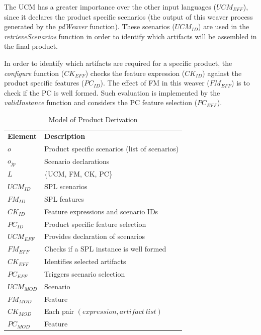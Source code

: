 \documentclass[times, 11pt,twocolumn]{article}
\begin{document}
The UCM has a greater importance over the other input languages ($UCM_{EFF}$),
since it declares the product specific scenarios (the output of this weaver
process generated by the \emph{pdWeaver} function). These scenarios ($UCM_{ID}$) are used
in the \emph{retrieveScenarios} function in order to identify which artifacts
will be assembled in the final product.

In order to identify which artifacts are required for a specific product, the
\emph{configure} function ($CK_{EFF}$) checks the feature expression ($CK_{ID}$)
against the product specific features ($PC_{ID}$). The effect of FM in this
weaver ($FM_{EFF}$) is to check if the PC is well formed. Such evaluation is
implemented by the \emph{validInstance} function and considers the PC feature
selection ($PC_{EFF}$). 

\begin{table}[htb]
\begin{center}
 \caption{Model of Product Derivation} \label{tab:pd-weaver}
\begin{tabular}{p{0.6in}p{2.4in}}
   \hline\noalign{\smallskip}
  {\bf Element} & {\bf Description} \\
   \noalign{\smallskip}
   \hline
   \noalign{\smallskip}
   $o$               & Product specific scenarios (list of scenarios) \\ 
   $o_{jp}$        & Scenario declarations \\ 
   $L$               & \{UCM, FM, CK, PC\} \\ 
   $UCM_{ID}$ & SPL scenarios \\ 
   $FM_{ID}$    & SPL features \\ 
   $CK_{ID}$    & Feature expressions and scenario IDs\\  
   $PC_{ID}$    & Product specific feature selection \\ 
   $UCM_{EFF}$ & Provides declaration of scenarios \\  
   $FM_{EFF}$    & Checks if a SPL instance is well formed \\ 
   $CK_{EFF}$    & Identifies selected artifacts  \\ 
   $PC_{EFF}$    &Triggers scenario selection \\
   $UCM_{MOD}$ & Scenario \\  
   $FM_{MOD}$   & Feature \\ 
   $CK_{MOD}$    & Each pair $(expression, artifact\ list)$  \\ 
   $PC_{MOD}$    & Feature \\
  \hline
  \end{tabular}
\end{center}
\end{table}
\end{document}
